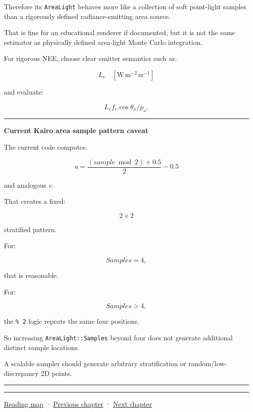 Therefore its \texttt{AreaLight} behaves more like a collection of soft point-light samples than a rigorously defined radiance-emitting area source.

That is fine for an educational renderer if documented, but it is not the same estimator as physically defined area-light Monte Carlo integration.

For rigorous NEE, choose clear emitter semantics such as:

\[
L_e\quad[\mathrm{W\,m^{-2}\,sr^{-1}}]
\]

and evaluate:

\[
L_e f_r\cos\theta_x/p_\omega.
\]

\begin{center}\rule{0.5\linewidth}{0.5pt}\end{center}

\textbf{Current Kairo area sample pattern caveat}

The current code computes:

\[
u=
\frac{
(sample\bmod2)+0.5
}{2}
-0.5
\]

and analogous \(v\).

That creates a fixed:

\[
2\times2
\]

stratified pattern.

For:

\[
Samples=4,
\]

that is reasonable.

For:

\[
Samples>4,
\]

the \texttt{\%\ 2} logic repeats the same four positions.

So increasing \texttt{AreaLight::Samples} beyond four does not generate additional distinct sample locations.

A scalable sampler should generate arbitrary stratification or random/low-discrepancy 2D points.

\begin{center}\rule{0.5\linewidth}{0.5pt}\end{center}

\begin{center}\rule{0.5\linewidth}{0.5pt}\end{center}

\href{Chapter\%20Edition/02\%20-\%20Graphics\%20Vision\%20and\%20XR/00\%20-\%20Reading\%20Map}{Reading map} · \hyperref[03-visual-computing-i-ch007]{Previous chapter} · \hyperref[03-visual-computing-i-ch009]{Next chapter}

